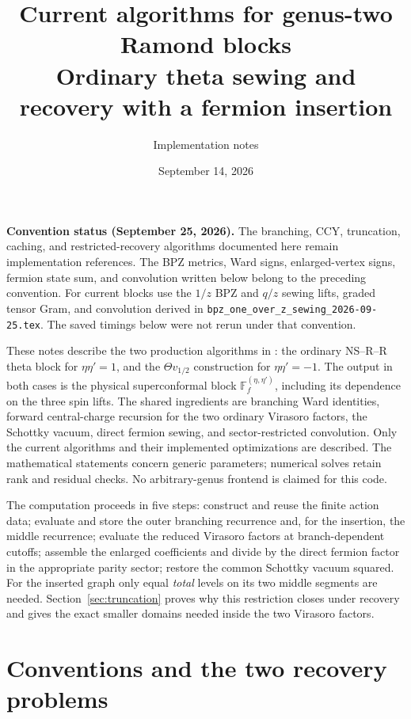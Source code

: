 \documentclass[11pt]{article}
\title{Current algorithms for genus-two Ramond blocks\\
\large Ordinary theta sewing and recovery with a fermion insertion}
\author{Implementation notes}
\date{September 14, 2026}
\newcommand{\FF}{\mathbb F}
\numberwithin{equation}{section}
\begin{document}
\maketitle

\noindent\textbf{Convention status (September 25, 2026).}
The branching, CCY, truncation, caching, and restricted-recovery
algorithms documented here remain implementation references. The
BPZ metrics, Ward signs, enlarged-vertex signs, fermion state sum,
and convolution written below belong to the preceding convention.
For current blocks use the $1/z$ BPZ and $q/z$ sewing lifts, graded
tensor Gram, and convolution derived in
\texttt{bpz\_one\_over\_z\_sewing\_2026-09-25.tex}. The saved
timings below were not rerun under that convention.

These notes describe the two production algorithms in :
the ordinary NS--R--R theta block for $\eta\eta'=1$, and the
$\Theta v_{1/2}$ construction for $\eta\eta'=-1$.
The output in both cases is the physical superconformal block
$\FF_f^{(\eta,\eta')}$, including its dependence on the three spin lifts.
The shared ingredients are branching Ward identities, forward
central-charge recursion for the two ordinary Virasoro factors, the
Schottky vacuum, direct fermion sewing, and sector-restricted convolution.
Only the current algorithms and their implemented optimizations are described.
The mathematical statements concern generic parameters; numerical solves retain
rank and residual checks. No arbitrary-genus frontend is claimed for this code.

The computation proceeds in five steps: construct and reuse the finite action
data; evaluate and store the outer branching recurrence and, for the insertion,
the middle recurrence; evaluate the reduced Virasoro factors at branch-dependent cutoffs;
assemble the enlarged coefficients and divide by the direct fermion factor
in the appropriate parity sector; restore the common Schottky vacuum squared.
For the inserted graph only equal \emph{total} levels on its two middle
segments are needed. Section~\ref{sec:truncation} proves why this restriction
closes under recovery and gives the exact smaller domains needed inside the
two Virasoro factors.

\tableofcontents

\section{Conventions and the two recovery problems}
\label{sec:conventions}
\end{document}
